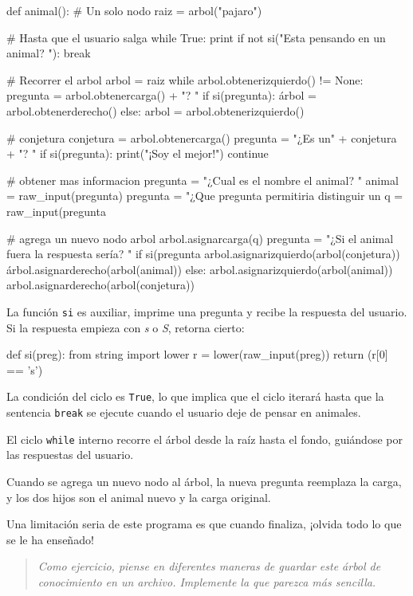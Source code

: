 \beforeverb 
\begin{pythoncode}
def animal():
  # Un solo nodo
  raiz = arbol("pajaro")

  # Hasta que el usuario salga
  while True:
    print
    if not si("Esta pensando en un animal? "): 
       break

    # Recorrer el arbol
    arbol = raiz
    while arbol.obtenerizquierdo() != None:
      pregunta = arbol.obtenercarga() + "? "
      if si(pregunta):
        árbol = arbol.obtenerderecho()
      else:
        arbol = arbol.obtenerizquierdo()

    # conjetura
    conjetura = arbol.obtenercarga()
    pregunta = "¿Es un" + conjetura + "? "
    if si(pregunta):
      print("¡Soy el mejor!")
      continue

    # obtener mas informacion
    pregunta  = "¿Cual es el nombre el animal? "
    animal  = raw_input(pregunta)
    pregunta  = "¿Que pregunta permitiria 
                  distinguir un %
    q = raw_input(pregunta %

    # agrega un nuevo nodo arbol
    arbol.asignarcarga(q)
    pregunta = "¿Si el animal fuera %
                la respuesta sería? "
    if si(pregunta %
      arbol.asignarizquierdo(arbol(conjetura))
      árbol.asignarderecho(arbol(animal))
    else:
      arbol.asignarizquierdo(arbol(animal))
      arbol.asignarderecho(arbol(conjetura))
\end{pythoncode}
\afterverb La función \texttt{si} es auxiliar, imprime una pregunta
y recibe la respuesta del usuario. Si la respuesta empieza con {\em
s} o {\em S}, retorna cierto:

\beforeverb 
\begin{pythoncode}
def si(preg):
  from string import lower
  r = lower(raw_input(preg))
  return (r[0] == 's')
\end{pythoncode}
\afterverb La condición del ciclo es \texttt{True}, lo que implica
que el ciclo iterará hasta que la sentencia \texttt{break} se ejecute
cuando el usuario deje de pensar en animales.

El ciclo \texttt{while} interno recorre el árbol desde la raíz hasta
el fondo, guiándose por las respuestas del usuario.

Cuando se agrega un nuevo nodo al árbol, la nueva pregunta reemplaza
la carga, y los dos hijos son el animal nuevo y la carga original.

Una limitación seria de este programa es que cuando finaliza, ¡olvida
todo lo que se le ha enseñado!
\begin{quote}
{\em Como ejercicio, piense en diferentes maneras de guardar este
árbol de conocimiento en un archivo. Implemente la que parezca más
sencilla.} 
\end{quote}

